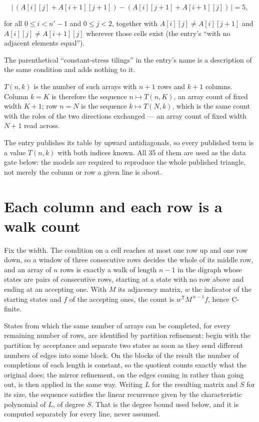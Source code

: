 \documentclass[11pt]{article}
\theoremstyle{definition}
\begin{document}
\[\bigl|\,(A[i][j] + A[i{+}1][j{+}1]) - (A[i][j{+}1] + A[i{+}1][j])\,\bigr| = 5,\]

for all $0 \le i < n'-1$ and $0 \le j < 2$, together with $A[i][j] \ne A[i][j{+}1]$ and $A[i][j] \ne A[i{+}1][j]$ wherever those cells exist (the entry's ``with no adjacent elements equal'').

The parenthetical ``constant-stress tilings'' in the entry's name is a description of the same condition and adds nothing to it.

$T(n,k)$ is the number of such arrays with $n + 1$ rows and $k + 1$ columns. Column $k = K$ is therefore the sequence $n \mapsto T(n,K)$, an array count of fixed width $K + 1$; row $n = N$ is the sequence $k \mapsto T(N,k)$, which is the same count with the roles of the two directions exchanged --- an array count of fixed width $N + 1$ read across.

The entry publishes its table by upward antidiagonals, so every published term is a value $T(n,k)$ with both indices known. All 35 of them are used as the data gate below: the models are required to reproduce the whole published triangle, not merely the column or row a given line is about.

\section{Each column and each row is a walk count}

Fix the width. The condition on a cell reaches at most one row up and one row down, so a window of three consecutive rows decides the whole of its middle row, and an array of $n$ rows is exactly a walk of length $n-1$ in the digraph whose states are pairs of consecutive rows, starting at a state with no row above and ending at an accepting one. With $M$ its adjacency matrix, $w$ the indicator of the starting states and $f$ of the accepting ones, the count is $w^{\mathsf T}M^{\,n-1}f$, hence C-finite.

States from which the same number of arrays can be completed, for every remaining number of rows, are identified by partition refinement: begin with the partition by acceptance and separate two states as soon as they send different numbers of edges into some block. On the blocks of the result the number of completions of each length is constant, so the quotient counts exactly what the original does; the mirror refinement, on the edges coming in rather than going out, is then applied in the same way. Writing $L$ for the resulting matrix and $S$ for its size, the sequence satisfies the linear recurrence given by the characteristic polynomial of $L$, of degree $S$. That is the degree bound used below, and it is computed separately for every line, never assumed.
\end{document}

